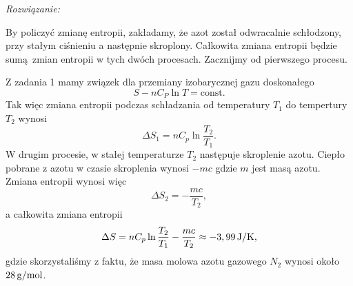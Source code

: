\documentclass[11pt,a4paper]{article}
\begin{document}
\vspace{5mm}
{\em Rozwiązanie:}

By policzyć zmianę entropii, zakładamy, że azot został odwracalnie schłodzony, przy stałym ciśnieniu a następnie skroplony. Całkowita zmiana entropii będzie sumą zmian entropii w tych dwóch procesach. Zacznijmy od pierwszego procesu.

Z zadania 1 mamy związek dla przemiany izobarycznej gazu doskonałego
\begin{equation}
    S-nC_P \ln T=\text{const.}
\end{equation}
Tak więc zmiana entropii podczas schładzania od temperatury $T_1$ do tempertury $T_2$ wynosi
\begin{equation}
	\Delta S_1 = n C_p \ln \frac{T_2}{T_1}.
\end{equation}
W drugim procesie, w stałej temperaturze $T_2$ następuje skroplenie azotu. Ciepło pobrane z azotu w czasie skroplenia wynosi $- m c$ gdzie $m$ jest masą azotu. Zmiana entropii wynosi więc
\begin{equation}
	\Delta S_2 = -\frac{m c }{T_2},
\end{equation}
a całkowita zmiana entropii 
\begin{equation}
	\Delta S = n C_p \ln \frac{T_2}{T_1} - \frac{m c }{T_2} \approx -3,99\, {\rm J/K},
\end{equation}
gdzie skorzystaliśmy z faktu, że masa molowa azotu gazowego $N_2$ wynosi około $28\,{\rm g/mol}$. 

\end{document}
